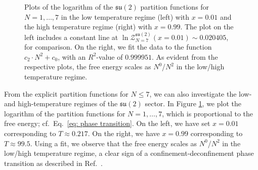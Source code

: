 \documentclass[a4paper,11pt]{article}
\begin{document}
\begin{figure}[tp]
\begin{center}
	\qquad
	\caption{Plots of the logarithm of the $\mathfrak{su}(2)$ partition functions for $N=1,\dotsc,7$ in the low temperature regime (left) with $x=0.01$ and the high temperature regime (right) with $x=0.99$. The plot on the left includes a constant line at $\ln \mathcal{Z}^{\mathfrak{su}(2)}_{N=7}(x=0.01) \sim 0.020405$, for comparison. On the right, we fit the data to the function $c_2\cdot N^2 + c_0$, with an $R^2$-value of $0.999951$. As evident from the respective plots, the free energy scales as $N^0$/$N^2$ in the low/high temperature regime.}
	\label{fig:su(2)_free_energy_N}
\end{center}
\end{figure}


From the explicit partition functions for $N\leq 7$, we can also investigate the low- and high-temperature 
regimes of the $\mathfrak{su}(2)$ sector. In Figure \ref{fig:su(2)_free_energy_N}, we plot the logarithm of the partition functions for $N=1,\dotsc,7$, which is proportional to the free energy; cf.\ Eq.\ \eqref{eq: phase transition}. On the left, we have set $x=0.01$ corresponding to $T\approx 0.217$. On the right, we have $x=0.99$ corresponding to $T\approx 99.5$.
Using a fit, we observe that the free energy scales as $N^0$/$N^2$ in the low/high temperature regime, a clear sign of a confinement-deconfinement phase transition as described in Ref.\ \cite{Witten:1998zw}.
\end{document}
